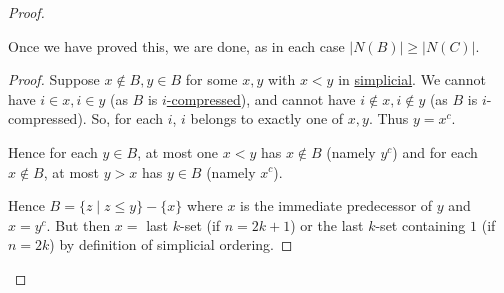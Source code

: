 \documentclass{article}
\begin{document}
\begin{proof}
\begin{center}
  \end{center}
  Once we have proved this, we are done, as in each case $|N(B)| \geq |N(C)|$.
  \begin{proof}
    Suppose $x \notin B, y \in B$ for some $x,y$ with $x<y$ in \hyperlink{def:simplicial}{simplicial}.
    We cannot have $i \in x, i \in y$ (as $B$ is \hyperlink{def:icomp}{$i$-compressed}), and cannot have $i \notin x, i \notin y$ (as $B$ is $i$-compressed).
    So, for each $i$, $i$ belongs to exactly one of $x,y$.
    Thus $y = x^c$.

    Hence for each $y \in B$, at most one $x < y$ has $x \notin B$ (namely $y^c$) and for each $x \notin B$, at most $y > x$ has $y \in B$ (namely $x^c$).

    Hence $B = \{z \mid z \leq y\} - \{x\}$ where $x$ is the immediate predecessor of $y$ and $x = y^c$.
    But then $x=$ last $k$-set (if $n=2k+1$) or the last $k$-set containing $1$ (if $n = 2k$)
    by definition of simplicial ordering. \qedhere \qedhere
  \end{proof}
\end{proof}
\end{document}
